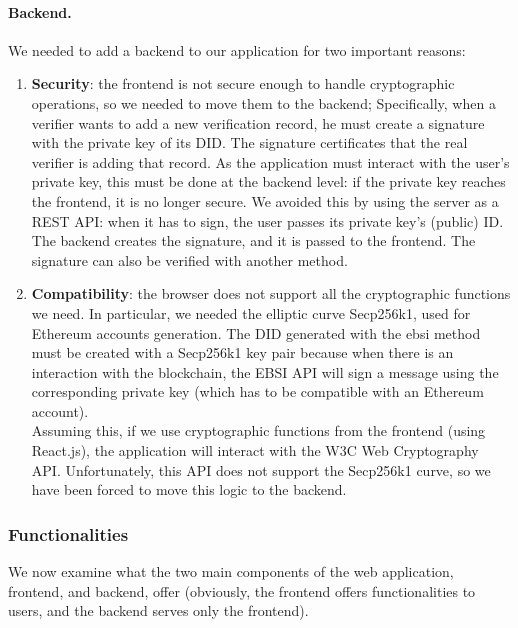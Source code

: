 \paragraph{Backend.}
We needed to add a backend to our application for two important reasons:
\begin{enumerate}
    \item \textbf{Security}: the frontend is not secure enough to handle cryptographic
    operations, so we needed to move them to the backend; Specifically, when a 
    verifier wants to add a new verification record, he must create a signature with 
    the private key of its DID. The signature certificates that the real verifier is
    adding that record. As the application must interact with the user's private key, 
    this must be done at the backend level: if the private key reaches the frontend, 
    it is no longer secure. We avoided this by using the server as a REST API: when 
    it has to sign, the user passes its private key's (public) ID. The backend creates
    the signature, and it is passed to the frontend. The signature can also be 
    verified with another method.
    \item \textbf{Compatibility}: the browser does not support all the cryptographic
    functions we need. In particular, we needed the elliptic curve Secp256k1, used 
    for Ethereum accounts generation. The DID generated with the ebsi method must be 
    created with a Secp256k1 key pair because when there is an interaction with the 
    blockchain, the EBSI API will sign a message using the corresponding private key
    (which has to be compatible with an Ethereum account).\\
    Assuming this, if we use cryptographic functions from the frontend (using 
    React.js), the application will interact with the W3C Web Cryptography API. 
    Unfortunately, this API does not support the Secp256k1 curve, so we have been 
    forced to move this logic to the backend. 
\end{enumerate}

\subsubsection{Functionalities}
We now examine what the two main components of the web application, frontend, and 
backend, offer (obviously, the frontend offers functionalities to users, and the 
backend serves only the frontend).
